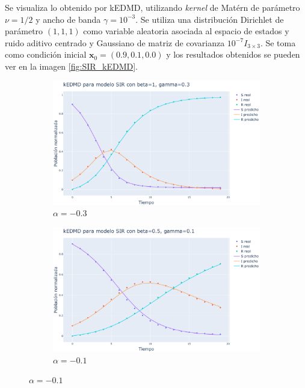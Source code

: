 Se visualiza lo obtenido por kEDMD, utilizando \textit{kernel} de Matérn de parámetro $\nu=1/2$ y ancho de banda $\gamma=10^{-3}$. Se utiliza una distribución Dirichlet de parámetro $(1,1,1)$ como variable aleatoria asociada al espacio de estados y ruido aditivo centrado y Gaussiano de matriz de covarianza $10^{-7} I_{3 \times 3}$. Se toma como condición inicial $\mathbf{x}_0 = (0.9, 0.1, 0.0)$ y los resultados obtenidos se pueden ver en la imagen \ref{fig:SIR_kEDMD}. \\
\begin{figure}[htbp]
    \centering
    \begin{subfigure}[b]{0.32\textwidth}
        \centering
        \includegraphics[width=\textwidth]{img/content/chapter3/SIR1.pdf}
        \caption{$\alpha=-0.3$}
        \label{fig:image1}
    \end{subfigure}
    \hfill
    \begin{subfigure}[b]{0.32\textwidth}
        \centering
        \includegraphics[width=\textwidth]{img/content/chapter3/SIR2.pdf}
        \caption{$\alpha=-0.1$}

\end{subfigure}
\end{figure}
